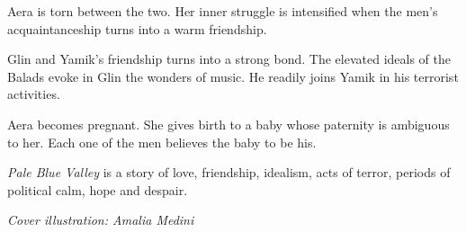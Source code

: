\documentclass[
  spinewidth=0.8325in,
  coverwidth=6in,
  coverheight=9.5in,
  marklength=0.125in,
  bleedwidth=0.125in,
  12pt
]{bookcover}
\begin{document}
\begin{bookcover}
{{\begin{addmargin}[0.2in]{-0.2in}
Aera is torn between the two. Her inner struggle is intensified when
the men's acquaintanceship turns into a warm friendship.

Glin and Yamik's friendship turns into a strong bond. The elevated
ideals of the Balads evoke in Glin the wonders of music. He readily
joins Yamik in his terrorist activities.

Aera becomes pregnant. She gives birth to a baby whose paternity is
ambiguous to her. Each one of the men believes the baby to be his.

\emph{Pale Blue Valley} is a story of love, friendship, idealism, acts of
terror, periods of political calm, hope and despair.

\vspace{0.2in}
\textit{Cover illustration: Amalia Medini}

\end{addmargin}
    }

}


\end{bookcover}
\end{document}
